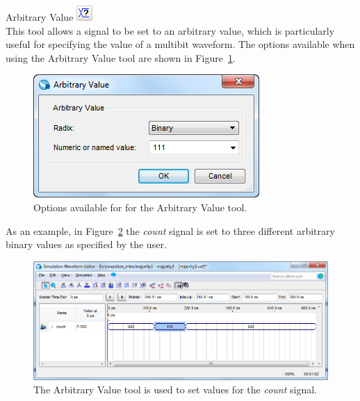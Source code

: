 \documentclass[11pt, twoside, pdftex]{article}
\begin{document}
\begin{description}
	\item {\sf Arbitrary Value} \hbox{\includegraphics[scale=0.7]{figures/appendix/icon12.png}}\\
	This tool allows a signal to be set to an arbitrary value, which is particularly useful 
	for specifying the value of a multibit waveform. The options available when using 
	the {\sf Arbitrary Value} tool are shown in Figure~\ref{fig:fig14}. 
	\begin{figure}[H]
	   \begin{center}
	      \includegraphics[scale=0.65]{figures/appendix/figure14.png}
	   \caption{Options available for for the {\sf Arbitrary Value} tool.} 
		 \label{fig:fig14}
		 \end{center}
	\end{figure}
	
	As an example, in Figure~\ref{fig:fig15} the {\it count} signal is set to three different 
	arbitrary binary values as specified by the user. 
	\begin{figure}[H]
	   \begin{center}
	      \includegraphics[scale=0.65]{figures/appendix/figure15.png}
	   \caption{The {\sf Arbitrary Value} tool is used to set values for the {\it count} signal.} 
		 \label{fig:fig15}
		 \end{center}
	\end{figure}
	

\end{description}
\end{document}
